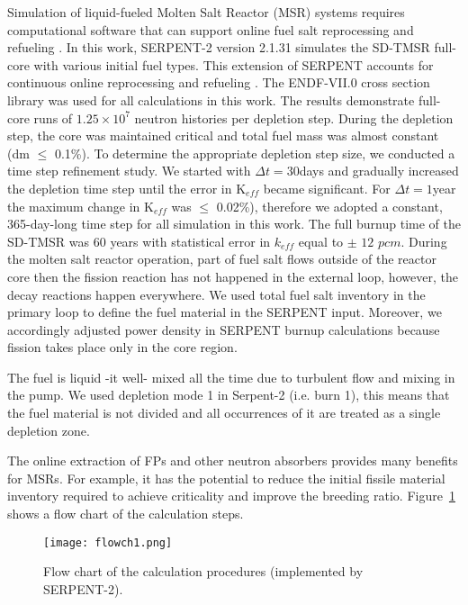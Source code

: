 Simulation of liquid-fueled Molten Salt Reactor (MSR) systems requires 
computational software that can support online fuel salt reprocessing and 
refueling \cite{serp2014molten}. In this work, SERPENT-2 version 2.1.31 \cite{leppanen2014serpent} simulates the 
SD-TMSR full-core with various initial fuel types. This extension 
of SERPENT accounts for continuous online reprocessing and refueling 
\cite{aufiero2013extended}. The ENDF-VII.0 cross section library was used for all 
calculations in this work. The results demonstrate full-core runs of
$1.25\times 10^7$ neutron histories per depletion step. During the depletion step, the core was maintained critical and total fuel mass was almost constant (dm $\leq$ 0.1\%). To determine the appropriate depletion step size, we conducted a time step refinement study. We started with $\Delta t=30$days and gradually increased the depletion time step until the error in K$_{eff}$ became significant. For $\Delta t=1$year the maximum change in K$_{eff}$ was $\leq$ 0.02\%), therefore we adopted a constant, 365-day-long time step for all simulation in this work.
The full burnup time of 
the SD-TMSR was 60 years with statistical error in $k_{eff}$ equal to $\pm$ 
$12$ $pcm$. 
During the molten salt reactor operation, part of fuel salt flows outside of the reactor core then the fission reaction has not happened in the external loop, however, the decay reactions happen everywhere. We used total fuel salt inventory in the primary loop to define the fuel material in the SERPENT input. Moreover, we accordingly adjusted power density in SERPENT burnup calculations because fission takes place only in the core region.

The fuel is liquid -it well- mixed all the time due to turbulent flow and mixing in the pump. We used depletion mode 1 in Serpent-2 (i.e. burn 1), this means that the fuel material is not divided and all occurrences of it are treated as a single depletion zone. 

The online extraction of \gls{FPs} and other neutron absorbers 
provides many benefits for MSRs. For example, it has the potential to reduce the initial 
fissile material inventory required to achieve criticality and improve the 
breeding ratio. Figure~\ref{fig:flow} shows a flow chart of the calculation 
steps. 

\begin{figure}[t!] %
	\texttt{[image: flowch1.png]}
	\caption{Flow chart of the calculation procedures (implemented by SERPENT-2).}
	\label{fig:flow}
\end{figure}

